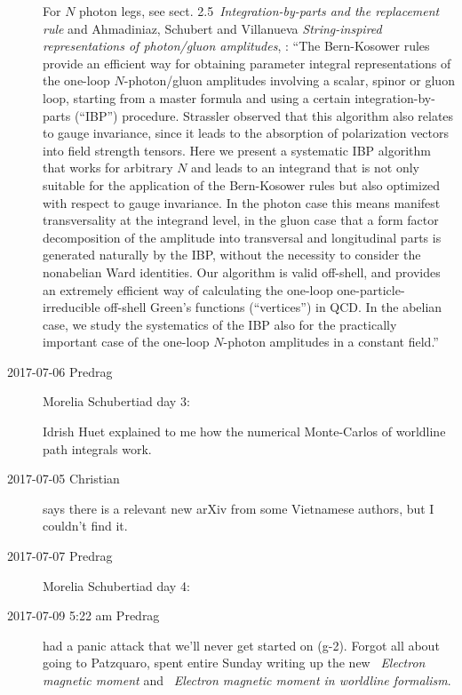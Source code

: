 \begin{description}
For $N$ photon legs, see sect. 2.5~{\em Integration-by-parts and the
replacement rule} and Ahmadiniaz, Schubert and Villanueva
{\em String-inspired representations of photon/gluon amplitudes},
:
``The Bern-Kosower rules provide an efficient way for obtaining parameter
integral representations of the one-loop $N$-photon/gluon amplitudes
involving a scalar, spinor or gluon loop, starting from a master formula
and using a certain integration-by-parts (``IBP'') procedure. Strassler
observed that this algorithm also relates to gauge invariance, since it
leads to the absorption of polarization vectors into field strength
tensors. Here we present a systematic IBP algorithm that works for
arbitrary $N$ and leads to an integrand that is not only suitable for the
application of the Bern-Kosower rules but also optimized with respect to
gauge invariance. In the photon case this means manifest transversality
at the integrand level, in the gluon case that a form factor
decomposition of the amplitude into transversal and longitudinal parts is
generated naturally by the IBP, without the necessity to consider the
nonabelian Ward identities. Our algorithm is valid off-shell, and
provides an extremely efficient way of calculating the one-loop
one-particle-irreducible off-shell Green's functions (``vertices'') in
QCD. In the abelian case, we study the systematics of the IBP also for
the practically important case of the one-loop $N$-photon amplitudes in a
constant field.''

\item[2017-07-06 Predrag] Morelia Schubertiad day 3:

Idrish Huet explained to me how the numerical Monte-Carlos of
worldline path integrals work.

\item[2017-07-05 Christian] says there is a relevant new arXiv from some Vietnamese
authors, but I couldn't find it.

\item[2017-07-07 Predrag] Morelia Schubertiad day 4:

\item[2017-07-09 5:22 am Predrag]
had a panic attack that we'll never get started on (g-2). Forgot all
about going to Patzquaro, spent entire Sunday writing up the new
~{\em Electron magnetic moment} and
~{\em Electron magnetic moment in worldline
formalism}.


\end{description}
